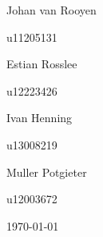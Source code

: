 \documentclass[hidelinks,a4paper,12pt]{article}
\begin{document}
\begin{titlepage}
\begin{center}
\begin{minipage}{0.4\textwidth}
\begin{flushleft} \large
Johan {van Rooyen}
\end{flushleft}
\end{minipage}
\begin{minipage}{0.4\textwidth}
\begin{flushright} \large
\emph{}
u11205131
\end{flushright}
\end{minipage}

\begin{minipage}{0.4\textwidth}
\begin{flushleft} \large
Estian {Rosslee}
\end{flushleft}
\end{minipage}
\begin{minipage}{0.4\textwidth}
\begin{flushright} \large
\emph{}
u12223426
\end{flushright}
\end{minipage}

\begin{minipage}{0.4\textwidth}
\begin{flushleft} \large
Ivan {Henning}
\end{flushleft}
\end{minipage}
\begin{minipage}{0.4\textwidth}
\begin{flushright} \large
\emph{}
u13008219
\end{flushright}
\end{minipage}

\begin{minipage}{0.4\textwidth}
\begin{flushleft} \large
Muller {Potgieter}
\end{flushleft}
\end{minipage}
\begin{minipage}{0.4\textwidth}
\begin{flushright} \large
\emph{}
u12003672
\end{flushright}
\end{minipage}

\vfill
{\large \today}
\end{center}
\end{titlepage}
\footnotesize
%
\normalsize


\tableofcontents
\newpage
{}
\end{document}
